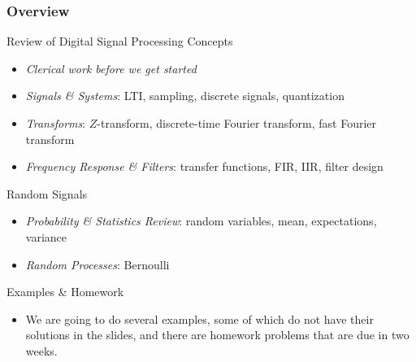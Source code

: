 \documentclass[mathserif,9pt,handout]{beamer}
\begin{document}
\begin{frame}\frametitle{Overview}\small
  \begin{block}{Review of Digital Signal Processing Concepts}
  \begin{itemize}
    \item {\em Clerical work before we get started}
    \item {\em Signals \& Systems}: LTI, sampling, discrete signals, quantization
    \item {\em Transforms}: $Z$-transform, discrete-time Fourier transform, fast Fourier transform 
    \item {\em Frequency Response \& Filters}: transfer functions, FIR, IIR, filter design 
  \end{itemize}
  \end{block}
  
  \begin{exampleblock}{Random Signals}
  \begin{itemize}
    \item {\em Probability \& Statistics Review}: random variables, mean, expectations, variance 
    \item {\em Random Processes}: Bernoulli
  \end{itemize}
  \end{exampleblock}
  
  \begin{alertblock}{Examples \& Homework}
  \begin{itemize}
    \item We are going to do several examples, some of which do not have their solutions in the slides, and there are homework problems that are due in two weeks. 
  \end{itemize}
  \end{alertblock}


\end{frame}
\end{document}
